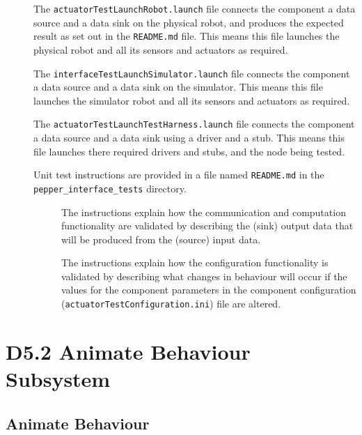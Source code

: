 \documentclass{CSSRforAfrica}
\newcommand{\checkboxChecked}{\fbox{\ding{51}}} %
\newcommand{\checkboxDashed}{\fbox{--}}         %
\begin{document}
\begin{description}
\item[\checkboxChecked] The {\small \verb+actuatorTestLaunchRobot.launch+} file  connects the component a data source and a data sink on the physical robot, and produces the expected result as set out in the  \small {\texttt{README.md}}   file.    This means this file launches the physical robot and all its sensors and actuators as required.

\item[\checkboxChecked] The {\small \verb+interfaceTestLaunchSimulator.launch+} file  connects the component a data source and a data sink on the simulator.    This means this file launches the simulator robot and all its sensors and actuators as required.

\item[\checkboxDashed] The {\small \verb+actuatorTestLaunchTestHarness.launch+} file  connects the component a data source and a data sink using a driver and a stub.   This means this file launches there required drivers and stubs, and the node being tested.

\item[\checkboxChecked] Unit test instructions are provided in a file named {\small \verb+README.md+} in the {\small \verb+pepper_interface_tests+} directory.

\begin{description}

\item[\checkboxChecked] The instructions  explain how the  communication and computation functionality are validated by describing the (sink) output data that will be produced from the (source) input data.  

\item[\checkboxChecked] The instructions  explain how the  configuration functionality is validated by describing what changes in behaviour will occur if the values for the component parameters in the component configuration ({\small \verb+actuatorTestConfiguration.ini+}) file are altered.

\end{description}
\end{description}
\newpage



\section{D5.2 Animate Behaviour Subsystem} 
\subsection{Animate Behaviour} 
\end{document}
